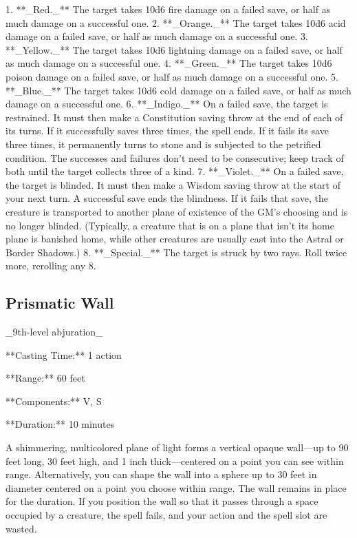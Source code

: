 1.  **_Red._** The target takes 10d6 fire damage on a failed save, or half as much damage on a successful one.
2.  **_Orange._** The target takes 10d6 acid damage on a failed save, or half as much damage on a successful one.
3.  **_Yellow._** The target takes 10d6 lightning damage on a failed save, or half as much damage on a successful one.
4.  **_Green._** The target takes 10d6 poison damage on a failed save, or half as much damage on a successful one.
5.  **_Blue._** The target takes 10d6 cold damage on a failed save, or half as much damage on a successful one.
6.  **_Indigo._** On a failed save, the target is restrained. It must then make a Constitution saving throw at the end of each of its turns. If it successfully saves three times, the spell ends. If it fails its save three times, it permanently turns to stone and is subjected to the petrified condition. The successes and failures don’t need to be consecutive; keep track of both until the target collects three of a kind.
7.  **_Violet._** On a failed save, the target is blinded. It must then make a Wisdom saving throw at the start of your next turn. A successful save ends the blindness. If it fails that save, the creature is transported to another plane of existence of the GM’s choosing and is no longer blinded. (Typically, a creature that is on a plane that isn’t its home plane is banished home, while other creatures are usually cast into the Astral or  Border Shadows.)
8.  **_Special._** The target is struck by two rays. Roll twice more, rerolling any 8.

\subsection{Prismatic Wall}

_9th-level abjuration_

**Casting Time:** 1 action

**Range:** 60 feet

**Components:** V, S

**Duration:** 10 minutes

A shimmering, multicolored plane of light forms a vertical opaque wall—up to 90 feet long, 30 feet high, and 1 inch thick—centered on a point you can see within range. Alternatively, you can shape the wall into a sphere up to 30 feet in diameter centered on a point you choose within range. The wall remains in place for the duration. If you position the wall so that it passes through a space occupied by a creature, the spell fails, and your action and the spell slot are wasted.

